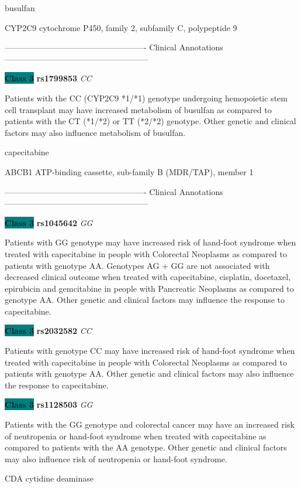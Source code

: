 \documentclass{resume} %
\begin{document}
\begin{rSection}{ busulfan }
\begin{rSubsection}{ CYP2C9 }{ cytochrome P450, family 2, subfamily C, polypeptide 9 }{}{}
\item[] ---------------------------------------------------- Clinical Annotations -----------------------------------------------------\newline
\item \textbf{\colorbox{teal} {Class 3}} \textbf{ rs1799853 } \textit{ CC }
\item[] Patients with the CC (CYP2C9 *1/*1) genotype undergoing hemopoietic stem cell transplant may have increased metabolism of busulfan as compared to patients with the CT (*1/*2) or TT (*2/*2) genotype. Other genetic and clinical factors may also influence metabolism of busulfan.
\end{rSubsection}

\end{rSection}\begin{rSection}{ capecitabine }
\item[]

\begin{rSubsection}{ ABCB1 }{ ATP-binding cassette, sub-family B (MDR/TAP), member 1 }{}{}
\item[]

\item[] ---------------------------------------------------- Clinical Annotations -----------------------------------------------------\newline
\item \textbf{\colorbox{teal} {Class 3}} \textbf{ rs1045642 } \textit{ GG }
\item[] Patients with GG genotype may have increased risk of hand-foot syndrome when treated with capecitabine in people with Colorectal Neoplasms as compared to patients with genotype AA. Genotypes AG + GG are not associated with decreased clinical outcome when treated with capecitabine, cisplatin, docetaxel, epirubicin and gemcitabine in people with Pancreatic Neoplasms as compared to genotype AA. Other genetic and clinical factors may influence the response to capecitabine.\item \textbf{\colorbox{teal} {Class 3}} \textbf{ rs2032582 } \textit{ CC }
\item[] Patients with genotype CC may have increased risk of hand-foot syndrome when treated with capecitabine in people with Colorectal Neoplasms as compared to patients with genotype AA. Other genetic and clinical factors may also influence the response to capecitabine.\item \textbf{\colorbox{teal} {Class 3}} \textbf{ rs1128503 } \textit{ GG }
\item[] Patients with the GG genotype and colorectal cancer may have an increased risk of neutropenia or hand-foot syndrome when treated with capecitabine as compared to patients with the AA genotype. Other genetic and clinical factors may also influence risk of neutropenia or hand-foot syndrome.
\end{rSubsection}\begin{rSubsection}{ CDA }{ cytidine deaminase }{}{}
\item[]


\end{rSubsection}
\end{rSection}
\end{document}
